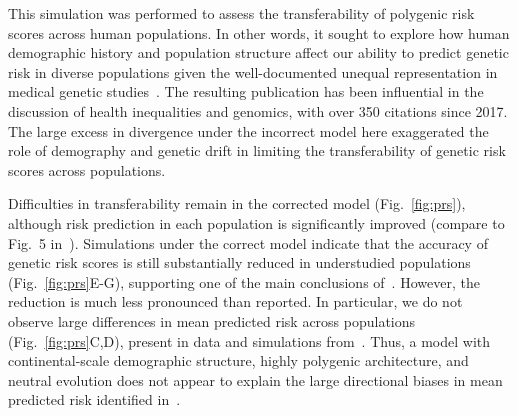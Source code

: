 \documentclass{article}
\begin{document}
This simulation was performed to assess the
transferability of polygenic risk scores across human populations. In other words, it sought to
explore how human demographic history and population structure affect our ability
to predict genetic risk in diverse populations given the well-documented unequal representation
in medical genetic studies~\citep{popejoy2016genomics}. The resulting publication has been
influential in the discussion of health inequalities and genomics, with over 350 citations since 2017.
The large excess in divergence under the incorrect model here exaggerated the role of demography
and genetic drift in limiting the transferability of genetic risk scores across populations.

Difficulties in transferability remain in the corrected model (Fig.~\ref{fig:prs}), although
risk prediction in each population is significantly improved (compare to Fig.~5 in~\citet{martin2017human}).
Simulations under the correct model indicate that the accuracy of genetic risk scores is still
substantially reduced in understudied populations (Fig.~\ref{fig:prs}E-G),
supporting one of the main conclusions of~\citet{martin2017human}.
However, the reduction is much less pronounced than reported.
In particular, we do not observe large differences in mean predicted risk
across populations (Fig.~\ref{fig:prs}C,D), present in data and simulations from~\citet{martin2017human}.
Thus, a model with continental-scale demographic structure, highly polygenic architecture, and
neutral evolution does not appear to explain the large directional biases
in mean predicted risk identified in~\citet{martin2017human}.
\end{document}

